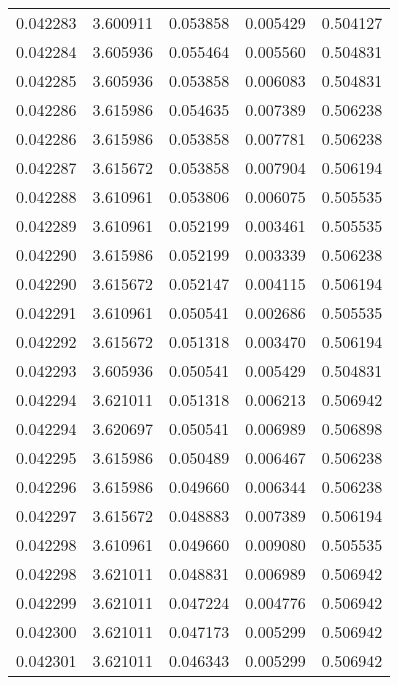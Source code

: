 \begin{tabular}{lrrrr}
0.042283    &  3.600911 &  0.053858 &  0.005429 &             0.504127 \\
0.042284    &  3.605936 &  0.055464 &  0.005560 &             0.504831 \\
0.042285    &  3.605936 &  0.053858 &  0.006083 &             0.504831 \\
0.042286    &  3.615986 &  0.054635 &  0.007389 &             0.506238 \\
0.042286    &  3.615986 &  0.053858 &  0.007781 &             0.506238 \\
0.042287    &  3.615672 &  0.053858 &  0.007904 &             0.506194 \\
0.042288    &  3.610961 &  0.053806 &  0.006075 &             0.505535 \\
0.042289    &  3.610961 &  0.052199 &  0.003461 &             0.505535 \\
0.042290    &  3.615986 &  0.052199 &  0.003339 &             0.506238 \\
0.042290    &  3.615672 &  0.052147 &  0.004115 &             0.506194 \\
0.042291    &  3.610961 &  0.050541 &  0.002686 &             0.505535 \\
0.042292    &  3.615672 &  0.051318 &  0.003470 &             0.506194 \\
0.042293    &  3.605936 &  0.050541 &  0.005429 &             0.504831 \\
0.042294    &  3.621011 &  0.051318 &  0.006213 &             0.506942 \\
0.042294    &  3.620697 &  0.050541 &  0.006989 &             0.506898 \\
0.042295    &  3.615986 &  0.050489 &  0.006467 &             0.506238 \\
0.042296    &  3.615986 &  0.049660 &  0.006344 &             0.506238 \\
0.042297    &  3.615672 &  0.048883 &  0.007389 &             0.506194 \\
0.042298    &  3.610961 &  0.049660 &  0.009080 &             0.505535 \\
0.042298    &  3.621011 &  0.048831 &  0.006989 &             0.506942 \\
0.042299    &  3.621011 &  0.047224 &  0.004776 &             0.506942 \\
0.042300    &  3.621011 &  0.047173 &  0.005299 &             0.506942 \\
0.042301    &  3.621011 &  0.046343 &  0.005299 &             0.506942 \\

\end{tabular}
